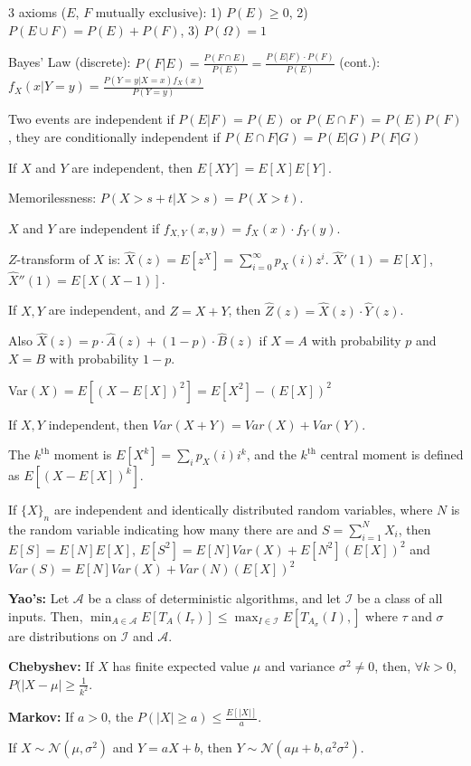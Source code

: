 \documentclass[11pt]{article}
\begin{document}
3 axioms ($E$, $F$ mutually exclusive):
1) $P(E)\geq 0$, 2) $P(E\cup F)=P(E)+P(F)$, 3) $P(\Omega)=1$

Bayes' Law (discrete): $P(F|E)=\frac{P(F\cap E)}{P(E)}=\frac{P(E|F)\cdot P(F)}{P(E)}$ \;\; (cont.): $f_X(x|Y=y)=\frac{P(Y=y|X=x)f_X(x)}{P(Y=y)}$

Two events are independent if $P(E|F)=P(E)$ or $P(E\cap F)=P(E)P(F)$, they are conditionally independent if $P(E\cap F|G)=P(E|G)P(F|G)$

If $X$ and $Y$ are independent, then $E[XY]=E[X]E[Y]$.

Memorilessness: $P(X>s+t|X>s)=P(X>t)$.

$X$ and $Y$ are independent if $f_{X,Y}(x,y)=f_X(x)\cdot f_Y(y)$.

$Z$-transform of $X$ is: $\widehat X(z)=E[z^X]=\sum_{i=0}^\infty p_X(i)z^i$. \qquad $\widehat X'(1)=E[X]$, $\widehat X''(1)=E[X(X-1)]$.

If $X,Y$ are independent, and $Z=X+Y$, then $\widehat Z(z)=\widehat X(z)\cdot\widehat Y(z)$.

Also $\widehat X(z)=p\cdot\widehat A(z)+(1-p)\cdot\widehat B(z)$ if $X=A$ with probability $p$ and $X=B$ with probability $1-p$.

Var$(X)=E[(X-E[X])^2]=E[X^2]-(E[X])^2$

If $X,Y$ independent, then $Var(X+Y)=Var(X)+Var(Y)$.

The $k^\text{th}$ moment is $E[X^k]=\sum_ip_X(i)i^k$, and the $k^\text{th}$ central moment is defined as $E[(X-E[X])^k]$.

If $\{X\}_n$ are independent and identically distributed random variables, where $N$ is the random variable indicating how many there are and $S=\sum_{i=1}^NX_i$, then $E[S]=E[N]E[X]$, $E[S^2]=E[N]Var(X)+E[N^2](E[X])^2$ and $Var(S)=E[N]Var(X)+Var(N)(E[X])^2$

{\bf Yao's:} Let $\mathcal{A}$ be a class of deterministic algorithms, and let
$\mathcal{I}$ be a class of all inputs. Then,
$\min_{A \in \mathcal{A}} E[T_A(I_{\tau})]
 \leq \max_{I \in \mathcal{I}} E[T_{A_{\sigma}} (I),]$ where $\tau$ and
$\sigma$ are distributions on $\mathcal{I}$ and $\mathcal{A}$.

{\bf Chebyshev:} If $X$ has finite expected value $\mu$ and variance
$\sigma^2 \neq 0$, then, $\forall k > 0$, $P(|X - \mu| \geq \frac{1}{k^2}$.

{\bf Markov:} If $a > 0$, the $P(|X| \geq a) \leq \frac{E[|X|]}{a}$.

If $X \sim \mathcal{N}(\mu,\sigma^2)$ and $Y = aX + b$, then $Y \sim \mathcal{N}(a\mu + b, a^2\sigma^2)$.
\end{document}
